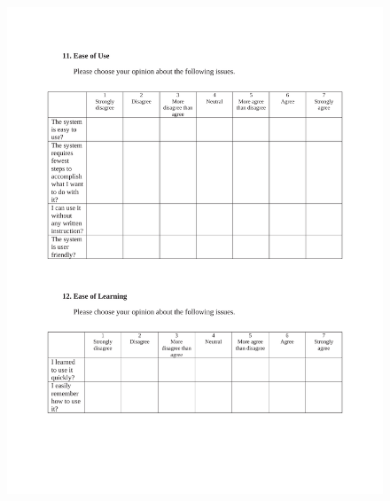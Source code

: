 \begin{appendices}
\begin{figure}[h!t]
    \centering
      \includegraphics[width=6in]{ch5/UsabilityQuestionnaire3.pdf}
  \label{UsabilityQuestionnaire3}
\end{figure}



\end{appendices}
